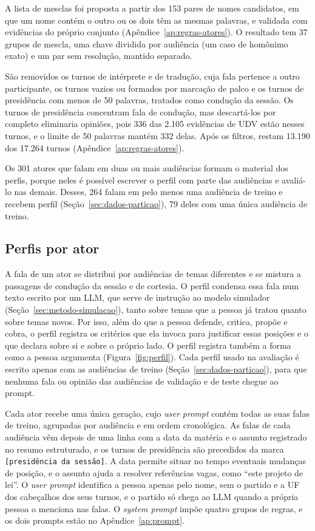 A lista de mesclas foi proposta a partir dos 153 pares de nomes candidatos, em que um nome contém o
outro ou os dois têm as mesmas palavras, e validada com evidências do próprio conjunto
(Apêndice~\ref{ap:regras-atores}). O resultado tem 37 grupos de mescla, uma chave dividida por
audiência (um caso de homônimo exato) e um par sem resolução, mantido separado.

São removidos os turnos de intérprete e de tradução, cuja fala pertence a outro participante, os
turnos vazios ou formados por marcação de palco e os turnos de presidência com menos de 50 palavras,
tratados como condução da sessão. Os turnos de presidência concentram fala de condução, mas
descartá-los por completo eliminaria opiniões, pois 336 das 2.105 evidências de UDV estão nesses
turnos, e o limite de 50 palavras mantém 332 delas. Após os filtros, restam 13.190 dos 17.264 turnos
(Apêndice~\ref{ap:regras-atores}).

Os 301 atores que falam em duas ou mais audiências formam o material dos perfis, porque neles é
possível escrever o perfil com parte das audiências e avaliá-lo nas demais. Desses, 264 falam em
pelo menos uma audiência de treino e recebem perfil (Seção~\ref{sec:dados-particao}), 79 deles com
uma única audiência de treino.

\subsection{Perfis por ator}
\label{sec:metodo-perfis}

A fala de um ator se distribui por audiências de temas diferentes e se mistura a passagens de
condução da sessão e de cortesia. O perfil condensa essa fala num texto escrito por um LLM, que serve
de instrução ao modelo simulador (Seção~\ref{sec:metodo-simulacao}), tanto sobre temas que a
pessoa já tratou quanto sobre temas novos. Por isso, além do que a pessoa defende, critica, propõe e
cobra, o perfil registra os critérios que ela invoca para justificar essas posições e o que declara
sobre si e sobre o próprio lado. O perfil registra também a forma como a pessoa argumenta
(Figura~\ref{fig:perfil}). Cada perfil usado na avaliação é escrito apenas com as audiências de
treino (Seção~\ref{sec:dados-particao}), para que nenhuma fala ou opinião das audiências de validação
e de teste chegue ao prompt.



Cada ator recebe uma única geração, cujo \textit{user prompt} contém todas as suas falas de treino,
agrupadas por audiência e em ordem cronológica. As falas de cada audiência vêm depois de uma linha
com a data da matéria e o assunto registrado no resumo estruturado, e os turnos de presidência são
precedidos da marca \texttt{[presidência da sessão]}. A data permite situar no tempo eventuais
mudanças de posição, e o assunto ajuda a resolver referências vagas, como ``este projeto de lei''. O
\textit{user prompt} identifica a pessoa apenas pelo nome, sem o partido e a UF dos cabeçalhos dos
seus turnos, e o partido só chega ao LLM quando a própria pessoa o menciona nas falas. O
\textit{system prompt} impõe quatro grupos de regras, e os dois prompts estão no
Apêndice~\ref{ap:prompt}.


